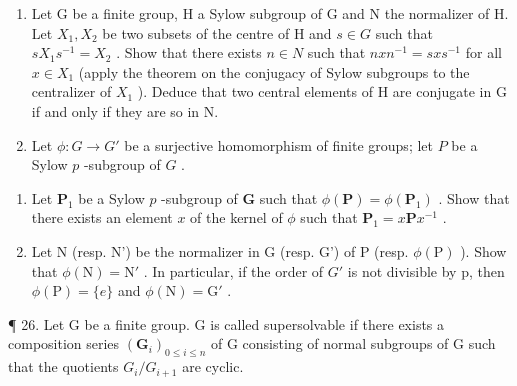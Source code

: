 \begin{enumerate}
\def\labelenumi{\arabic{enumi}.}
\setcounter{enumi}{23}
\item
  Let G be a finite group, H a Sylow subgroup of G and N the normalizer of H. Let \(X_{1}, X_{2}\) be two subsets of the centre of H and \(s \in G\) such that \(sX_{1}s^{-1} = X_{2}\) . Show that there exists \(n \in N\) such that \(nxn^{-1} = sxs^{-1}\) for all \(x \in X_{1}\) (apply the theorem on the conjugacy of Sylow subgroups to the centralizer of \(X_{1}\) ). Deduce that two central elements of H are conjugate in G if and only if they are so in N.
\item
  Let \(\phi: G \to G'\) be a surjective homomorphism of finite groups; let \(P\) be a Sylow \(p\) -subgroup of \(G\) .
\end{enumerate}

\begin{enumerate}
\def\labelenumi{(\alph{enumi})}
\item
  Let \(\mathbf{P}_1\) be a Sylow \(p\) -subgroup of \(\mathbf{G}\) such that \(\phi(\mathbf{P}) = \phi(\mathbf{P}_1)\) . Show that there exists an element \(x\) of the kernel of \(\phi\) such that \(\mathbf{P}_1 = x\mathbf{P}x^{-1}\) .
\item
  Let N (resp. N') be the normalizer in G (resp. G') of P (resp. \(\phi(\mathrm{P})\) ). Show that \(\phi(\mathrm{N}) = \mathrm{N}'\) . In particular, if the order of \(G'\) is not divisible by p, then \(\phi(\mathrm{P}) = \{e\}\) and \(\phi(\mathrm{N}) = \mathrm{G}'\) .
\end{enumerate}

¶ 26. Let G be a finite group. G is called supersolvable if there exists a composition series \((\mathbf{G}_{i})_{0\leqslant i\leqslant n}\) of G consisting of normal subgroups of G such that the quotients \(G_{i}/G_{i+1}\) are cyclic.

